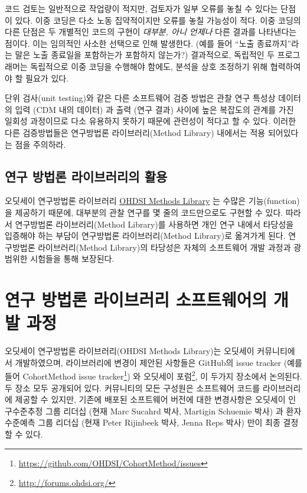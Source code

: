 \documentclass[11pt]{book}
\let\rmarkdownfootnote\footnote%
\def\footnote{\protect\rmarkdownfootnote}
\theoremstyle{definition}
\theoremstyle{definition}
\theoremstyle{definition}
\theoremstyle{remark}
\begin{document}
코드 검토는 일반적으로 작업량이 적지만, 검토자가 일부 오류를 놓칠 수
있다는 단점이 있다. 이중 코딩은 다소 노동 집약적이지만 오류를 놓칠
가능성이 적다. 이중 코딩의 다른 단점은 두 개별적인 코드의 구현이
\emph{대부분, 아니 언제나} 다른 결과를 나타낸다는 점이다. 이는 임의적인
사소한 선택으로 인해 발생한다. (예를 들어 ``노출 종료까지''라는 말은
노출 종료일을 포함하는가 포함하지 않는가?) 결과적으로, 독립적인 두
프로그래머는 독립적으로 이중 코딩을 수행해야 함에도, 분석을 상호
조정하기 위해 협력하여야 할 필요가 있다.

단위 검사(unit testing)와 같은 다른 소프트웨어 검증 방법은 관찰 연구
특성상 데이터의 입력 (CDM 내의 데이터) 과 출력 (연구 결과) 사이에 높은
복잡도의 관계를 가진 일회성 과정이므로 다소 유용하지 못하기 때문에
관련성이 적다고 할 수 있다. 이러한 다른 검증방법들은 연구방법론
라이브러리(Method Library) 내에서는 적용 되어있다는 점을 주의하라.

\subsection{연구 방법론 라이브러리의 활용}\label{---}

오딧세이 연구방법론 라이브러리
\href{https://ohdsi.github.io/MethodsLibrary/}{OHDSI Methods Library} 는
수많은 기능(function)을 제공하기 때문에, 대부분의 관찰 연구를 몇 줄의
코드만으로도 구현할 수 있다. 따라서 연구방법론 라이브러리(Method
Library)를 사용하면 개인 연구 내에서 타당성을 입증해야 하는 부담이
연구방법론 라이브러리(Method Library)로 옮겨가게 된다. 연구방법론
라이브러리(Method Library)의 타당성은 자체의 소프트웨어 개발 과정과
광범위한 시험들을 통해 보장된다.

\section{연구 방법론 라이브러리 소프트웨어의 개발 과정}\label{-----}

오딧세이 연구방법론 라이브러리(OHDSI Methods Library)는 오딧세이
커뮤니티에서 개발하였으며, 라이브러리에 변경이 제안된 사항들은 GitHub의
issue tracker (예를 들어 CohortMethod issue tracker\footnote{\url{https://github.com/OHDSI/CohortMethod/issues}})
와 오딧세이 포럼\footnote{\url{http://forums.ohdsi.org/}}, 이 두가지
장소에서 논의된다. 두 장소 모두 공개되어 있다. 커뮤니티의 모든 구성원은
소프트웨어 코드를 라이브러리에 제공할 수 있지만, 기존에 배포된
소프트웨어 버전에 대한 변경사항은 오딧세이 인구수준추정 그룹 리더십
(현재 Marc Sucahrd 박사, Martigin Schuemie 박사) 과 환자수준예측 그룹
리더십 (현재 Peter Rijinbeek 박사, Jenna Reps 박사) 만이 최종 결정할 수
있다.
\end{document}
